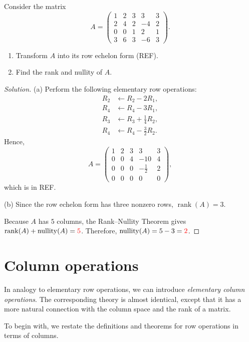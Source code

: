 \documentclass[12pt]{article}
\newenvironment{solution}
{\begin{proof}[Solution]}
{\end{proof}}
\begin{document}
Consider the matrix
\[
A=
\begin{pmatrix}
1&2&3&3&3\\
2&4&2&-4&2\\
0&0&1&2&1\\
3&6&3&-6&3
\end{pmatrix}.
\]

\begin{enumerate}
    \item[(a)] Transform $A$ into its row echelon form (REF).
    \item[(b)] Find the rank and nullity of $A$.
\end{enumerate}

\begin{solution}
(a) Perform the following elementary row operations:
\[
\begin{aligned}
R_2 &\leftarrow R_2-2R_1,\\
R_4 &\leftarrow R_4-3R_1,\\
R_3 &\leftarrow R_3+\frac14R_2,\\
R_4 &\leftarrow R_4-\frac32R_2.
\end{aligned}
\]
Hence,
\[
A
=
\begin{pmatrix}
1&2&3&3&3\\
0&0&4&-10&4\\
0&0&0&-\frac12&2\\
0&0&0&0&0
\end{pmatrix},
\]
which is in REF.

(b) Since the row echelon form has three nonzero rows, $\operatorname{rank}(A)=3$.

Because $A$ has $5$ columns, the Rank--Nullity Theorem gives $\operatorname{rank}(A)+\operatorname{nullity}(A)=\textcolor{red}{5}$.
Therefore, $\operatorname{nullity}(A)=5-3=\textcolor{red}{2}$.

\end{solution}

\newpage

\section{Column operations}

In analogy to elementary row operations, we can introduce
\emph{elementary column operations}. The corresponding theory is almost
identical, except that it has a more natural connection with the column
space and the rank of a matrix.

To begin with, we restate the definitions and theorems for row
operations in terms of columns.
\end{document}
